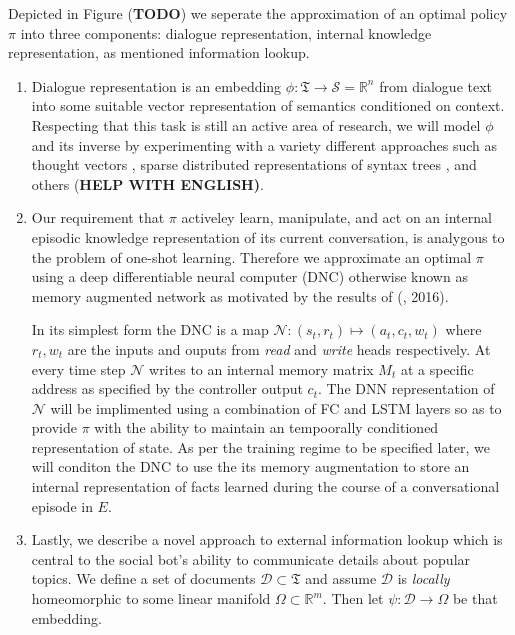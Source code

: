 \documentclass{article} %
\numberwithin{equation}{subsection}
\numberwithin{theorem}{subsection}
\theoremstyle{named}
\def\scriptd{{\mathcal D}}
\def\scriptn{{\mathcal N}}
\def\scripts{{\mathcal S}}
\begin{document}
Depicted in Figure (\textbf{TODO}) we seperate the approximation of an optimal policy $\pi$ into three components: dialogue representation, internal knowledge representation, as mentioned information lookup.
\begin{enumerate}
\item Dialogue representation is an embedding $\phi: \mathfrak{T} \to \scripts = \mathbb{R}^n$ from dialogue text into some suitable vector representation of semantics conditioned on context. Respecting that this task is still an active area of research, we will model $\phi$ and its inverse by experimenting with a variety different approaches such as thought vectors \cite{NIPS2015_5950}, sparse distributed representations of syntax trees \cite{DBLP:journals/corr/YogatamaFDS14}, and others (\textbf{HELP WITH ENGLISH)}.

\item Our requirement that $\pi$ activeley learn, manipulate, and act on an internal episodic knowledge representation of its current conversation, is analygous to the problem of one-shot learning. Therefore we approximate an optimal $\pi$ using a deep differentiable neural computer (DNC)\cite{graves2016hybrid}\cite{DBLP:journals/corr/GravesWD14} otherwise known as memory augmented network as motivated by the results of (\citeauthor{DBLP:journals/corr/SantoroBBWL16}, 2016).

In its simplest form the DNC is a map $\scriptn: (s_t, r_t) \mapsto (a_t, c_t, w_t)$ where  $r_t, w_t$ are the inputs and ouputs from \emph{read} and \emph{write} heads respectively. At every time step $\scriptn$ writes to an internal memory matrix $M_t$ at a specific address as specified by the controller output $c_t$. The DNN representation of $\scriptn$ will be implimented using a combination of FC and LSTM layers so as to provide $\pi$ with the ability to maintain an tempoorally conditioned representation of state. As per the training regime to be specified later, we will conditon the DNC to use the its memory augmentation to store an internal representation of facts learned during the course of a conversational episode in $E$.

\item Lastly, we describe a novel approach to external information lookup which is central to the social bot's ability to communicate details about popular topics. We define a set of documents $\scriptd \subset \mathfrak{T}$ and assume $\scriptd$ is \emph{locally} homeomorphic to some linear manifold $\Omega \subset \mathbb{R}^m$. Then let $\psi: \scriptd \to \Omega$ be that embedding.


\end{enumerate}
\end{document}
